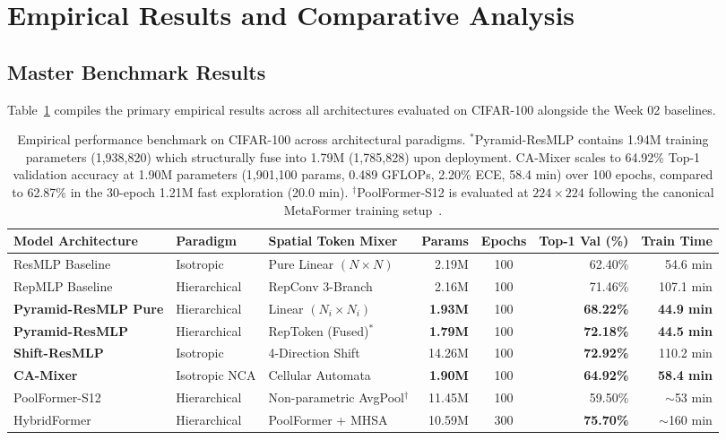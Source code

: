 \section{Empirical Results and Comparative Analysis}
\label{section:results}

\subsection{Master Benchmark Results}
Table~\ref{tab:benchmark_master} compiles the primary empirical results across all architectures evaluated on CIFAR-100 alongside the Week 02 baselines.

\begin{table}[htbp]
\centering
\begin{adjustbox}{max width=\textwidth}
\small
\setlength{\tabcolsep}{5pt}
\begin{tabular}{lllrcrr}
\toprule
\textbf{Model Architecture} & \textbf{Paradigm} & \textbf{Spatial Token Mixer} & \textbf{Params} & \textbf{Epochs} & \textbf{Top-1 Val (\%)} & \textbf{Train Time} \\
\midrule
ResMLP Baseline & Isotropic & Pure Linear $(N \times N)$ & 2.19M & 100 & 62.40\% & 54.6 min \\
RepMLP Baseline & Hierarchical & RepConv 3-Branch & 2.16M & 100 & 71.46\% & 107.1 min \\
\textbf{Pyramid-ResMLP Pure} & Hierarchical & Linear $(N_i \times N_i)$ & \textbf{1.93M} & 100 & \textbf{68.22\%} & \textbf{44.9 min} \\
\textbf{Pyramid-ResMLP} & Hierarchical & RepToken (Fused)$^*$ & \textbf{1.79M} & 100 & \textbf{72.18\%} & \textbf{44.5 min} \\
\textbf{Shift-ResMLP} & Isotropic & 4-Direction Shift & 14.26M & 100 & \textbf{72.92\%} & 110.2 min \\
\textbf{CA-Mixer} & Isotropic NCA & Cellular Automata & \textbf{1.90M} & 100 & \textbf{64.92\%} & \textbf{58.4 min} \\
PoolFormer-S12 & Hierarchical & Non-parametric AvgPool$^\dagger$ & 11.45M & 100 & 59.50\% & $\sim$53 min \\
HybridFormer & Hierarchical & PoolFormer + MHSA & 10.59M & 300 & \textbf{75.70\%} & $\sim$160 min \\
\bottomrule
\end{tabular}
\end{adjustbox}
\vspace{0.4em}
\caption{Empirical performance benchmark on CIFAR-100 across architectural paradigms. $^*$Pyramid-ResMLP contains 1.94M training parameters (1,938,820) which structurally fuse into 1.79M (1,785,828) upon deployment. CA-Mixer scales to 64.92\% Top-1 validation accuracy at 1.90M parameters (1,901,100 params, 0.489 GFLOPs, 2.20\% ECE, 58.4 min) over 100 epochs, compared to 62.87\% in the 30-epoch 1.21M fast exploration (20.0 min). $^\dagger$PoolFormer-S12 is evaluated at $224 \times 224$ following the canonical MetaFormer training setup~\cite{yu2022metaformer}.}
\label{tab:benchmark_master}
\end{table}

